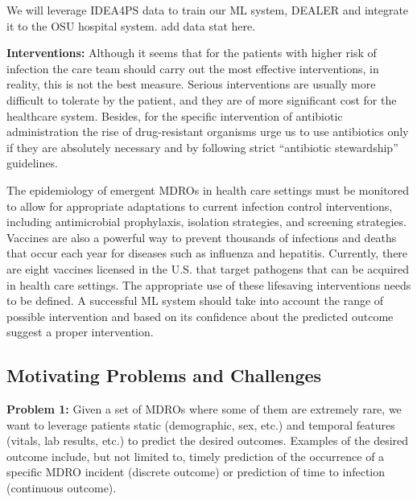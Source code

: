 We will leverage IDEA4PS data to train our ML system, DEALER and integrate it to the OSU hospital system. {\color{red} add data stat here. }


{\bf Interventions:}
Although it seems that for the patients with higher risk of infection the care team should carry out the most effective interventions, in reality, this is not the best measure. Serious interventions are usually more difficult to tolerate by the patient, and they are of more significant cost for the healthcare system. Besides, for the specific intervention of antibiotic administration the rise of drug-resistant organisms urge us to use antibiotics only if they are absolutely necessary and by following strict ``antibiotic stewardship'' guidelines.

The epidemiology of emergent MDROs in health care settings must be monitored to allow for appropriate adaptations to current infection control interventions, including antimicrobial prophylaxis, isolation strategies, and screening strategies. Vaccines are also a powerful way to prevent thousands of infections and deaths that occur each year for diseases such as influenza and hepatitis. Currently, there are eight vaccines licensed in the U.S. that target pathogens that can be acquired in health care settings. The appropriate use of these lifesaving interventions needs to be defined.
A successful ML system should take into account the range of possible intervention and based on its confidence about the predicted outcome suggest a proper intervention.


\subsection{Motivating Problems and Challenges}
{\noindent \bf Problem 1:} Given a set of MDROs where some of them are extremely rare, we want to leverage patients static (demographic, sex, etc.) and temporal features (vitals, lab results, etc.) to predict the desired outcomes. Examples of the desired outcome include, but not limited to, timely prediction of the occurrence of a specific MDRO incident (discrete outcome) or prediction of time to infection (continuous outcome).

